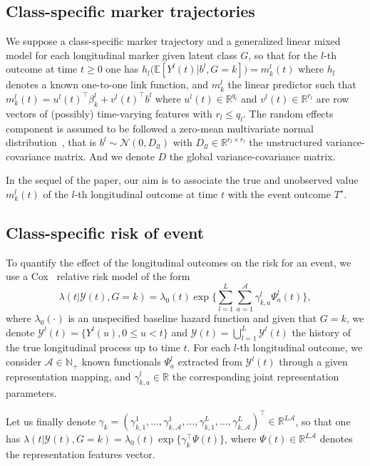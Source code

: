 \documentclass[11pt]{article}
\newcommand{\cY}{\mathcal Y}
\newcommand{\cN}{\mathcal N}
\newcommand{\cA}{\mathcal A}
\newcommand{\R}{\mathds R}
\newcommand{\N}{\mathds N}
\newcommand{\E}{\mathds E}
\begin{document}
\subsection{Class-specific marker trajectories}

We suppose a class-specific marker trajectory and a generalized linear mixed model for each longitudinal marker given latent class $G$, so that for the $l$-th outcome at time $t \geq 0$ one has $h_l\big(\E[Y^l(t)|b^l, G=k]\big) = m_k^l(t)$ where $h_l$ denotes a known one-to-one link function, and $m_k^l$ the linear predictor such that $m_k^l(t) = u^l(t)^\top\beta_k^l + v^l(t)^\top b^l$ where $u^l(t) \in \R^{q_l}$  and $v^l(t) \in \R^{r_l}$ are row vectors of (possibly) time-varying features  with $r_l \leq q_l$.
The random effects component is assumed to be followed a zero-mean multivariate normal distribution~\citep{hickey2016joint}, that is $b^l \sim \cN(0, D_{ll})$
with $D_{ll} \in \R^{r_l \times r_l}$ the unstructured variance-covariance matrix. And we denote $D$ the global variance-covariance matrix.

In the sequel of the paper, our aim is to associate the true and unobserved value $m_k^l(t)$ of the $l$-th longitudinal outcome at time $t$ with the event outcome $T^\star$.

\subsection{Class-specific risk of event}

To quantify the effect of the longitudinal outcomes on the risk for an event, we use a Cox~\citep{Cox1972JRSS} relative risk model of the form
\begin{equation*}
  \label{eq:intensity-model}
  \lambda(t|\cY(t), G = k) = \lambda_0(t) \exp \Big\{\sum_{l=1}^L \sum_{a=1}^\cA {\gamma_{k,a}^l} \Psi_a^l(t) \Big\},
\end{equation*}
where $\lambda_0(\cdot)$ is an unspecified baseline hazard function and given that $G = k$, we denote $\cY^l(t) = \{Y^l(u), 0 \leq u < t\}$ and $\cY(t) = \bigcup_{l=1}^L \cY^l(t)$ the history of the true longitudinal process up to time $t$.
For each $l$-th longitudinal outcome, we consider $\cA \in \N_+$ known functionals $\Psi_a^l$ extracted from $\cY^l(t)$ through a given representation mapping, and $\gamma_{k,a}^l \in \R$ the corresponding joint representation parameters.  

Let us finally denote $\gamma_k= (\gamma_{k,1}^1, \ldots, \gamma_{k,\cA}^1, \ldots, \gamma_{k,1}^L, \ldots, \gamma_{k,\cA}^L )^\top \in \R^{L\cA}$, so that one has $\lambda(t|\cY(t), G = k) = \lambda_0(t) \exp \big\{\gamma_k^\top \Psi(t) \big\}$, where $\Psi(t) \in \R^{L\cA}$ denotes the representation features vector.
\end{document}
